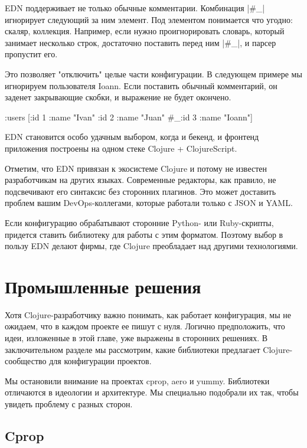 EDN поддерживает не только обычные комментарии. Комбинация \spverb|#_| игнорирует
следующий за ним элемент. Под элементом понимается что угодно: скаляр,
коллекция. Например, если нужно проигнорировать словарь, который занимает
несколько строк, достаточно поставить перед ним \spverb|#_|, и парсер пропустит
его.

Это позволяет "отключить" целые части конфигурации. В следующем примере мы
игнорируем пользователя Ioann. Если поставить обычный комментарий, он заденет
закрывающие скобки, и выражение не будет окончено.

\begin{code}
{:users [{:id 1 :name "Ivan"}
         {:id 2 :name "Juan"}
         #_{:id 3 :name "Ioann"}]}
\end{code}

EDN становится особо удачным выбором, когда и бекенд, и фронтенд приложения
построены на одном стеке Clojure + ClojureScript.

Отметим, что EDN привязан к экосистеме Clojure и потому не известен
разработчикам на других языках. Современные редакторы, как правило, не
подсвечивают его синтаксис без сторонних плагинов. Это может доставить проблем
вашим DevOps-коллегами, которые работали только с JSON и YAML.

Если конфигурацию обрабатывают сторонние Python- или Ruby-скрипты, придется
ставить библиотеку для работы с этим форматом. Поэтому выбор в пользу EDN делают
фирмы, где Clojure преобладает над другими технологиями.

\section{Промышленные решения}

Хотя Clojure-разработчику важно понимать, как работает конфигурация, мы не
ожидаем, что в каждом проекте ее пишут с нуля. Логично предположить, что идеи,
изложенные в этой главе, уже выражены в сторонних решениях. В заключительном
разделе мы рассмотрим, какие библиотеки предлагает Clojure-сообщество для
конфигурации проектов.

Мы остановили внимание на проектах cprop, aero и yummy. Библиотеки отличаются в
идеологии и архитектуре. Мы специально подобрали их так, чтобы увидеть проблему
с разных сторон.

\subsection{Cprop}

